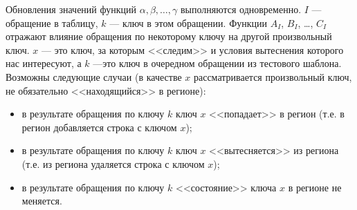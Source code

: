 Обновления значений функций $\alpha, \beta, \dots, \gamma$ выполняются одновременно. $I$ --- обращение в таблицу, $k$ --- ключ в этом обращении. Функции $A_I$, $B_I$, \dots, $C_I$ отражают влияние обращения по некоторому ключу на другой произвольный ключ. $x$ --- это ключ, за которым <<следим>> и условия вытеснения которого нас интересуют, а $k$ ---это ключ в очередном обращении из тестового шаблона.
Возможны следующие случаи (в качестве $x$ рассматривается произвольный ключ, не
обязательно <<находящийся>> в регионе):
\begin{itemize}
    \item в результате обращения по ключу $k$ ключ $x$ <<попадает>> в регион (т.е. в регион добавляется строка с ключом $x$);
    \item в результате обращения по ключу $k$ ключ $x$ <<вытесняется>> из региона (т.е. из региона удаляется строка с ключом $x$);
    \item в результате обращения по ключу $k$ <<состояние>> ключа $x$ в регионе не меняется.
\end{itemize}


